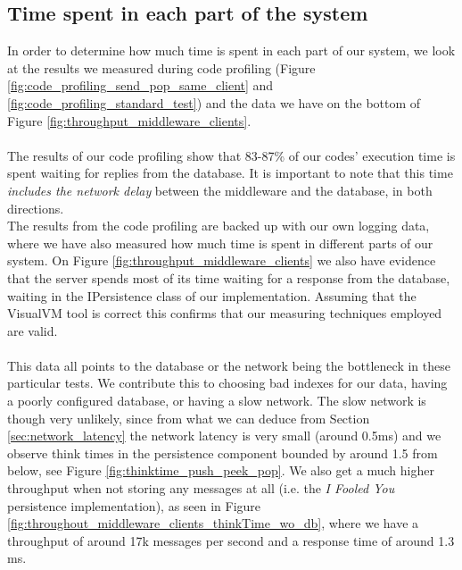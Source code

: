 \documentclass{article}
\begin{document}
        \subsection{Time spent in each part of the system}
            \label{sec:time_spent_in_each_part_of_the_system}
            In order to determine how much time is spent in each part of our system, we look at the results we measured during code profiling (Figure \ref{fig:code_profiling_send_pop_same_client} and \ref{fig:code_profiling_standard_test}) and the data we have on the bottom of Figure \ref{fig:throughput_middleware_clients}.\\
            \\
            The results of our code profiling show that 83-87\% of our codes' execution time is spent waiting for replies from the database. It is important to note that this time \textit{includes the network delay} between the middleware and the database, in both directions.\\
            The results from the code profiling are backed up with our own logging data, where we have also measured how much time is spent in different parts of our system. On Figure \ref{fig:throughput_middleware_clients} we also have evidence that the server spends most of its time waiting for a response from the database, waiting in the IPersistence class of our implementation. Assuming that the VisualVM tool is correct this confirms that our measuring techniques employed are valid.\\
            \\
            This data all points to the database or the network being the bottleneck in these particular tests. We contribute this to choosing bad indexes for our data, having a poorly configured database, or having a slow network. The slow network is though very unlikely, since from what we can deduce from Section \ref{sec:network_latency} the network latency is very small (around 0.5ms) and we observe think times in the persistence component bounded by around 1.5 from below, see Figure \ref{fig:thinktime_push_peek_pop}. We also get a much higher throughput when not storing any messages at all (i.e. the \textit{I Fooled You} persistence implementation), as seen in Figure \ref{fig:throughout_middleware_clients_thinkTime_wo_db}, where we have a throughput of around 17k messages per second and a response time of around 1.3 ms.

\end{document}
